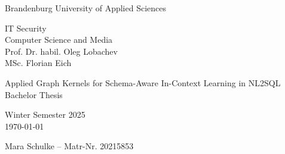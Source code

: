 \begin{titlepage}
    \begin{center}
        \begin{Large}
            Brandenburg University of Applied Sciences \\[1em]
        \end{Large}
        IT Security \\
        Computer Science and Media \\
        Prof. Dr. habil. Oleg Lobachev \\
        MSc. Florian Eich
    \end{center}

    \vfill

    \begin{center}
        \Large{Applied Graph Kernels for Schema-Aware In-Context Learning in NL2SQL}\\[0.5em]
        \large{Bachelor Thesis}\\[1em]
        
        \begin{normalsize}
            Winter Semester 2025\\[0.25em]
            \today
        \end{normalsize}
    \end{center}

    \vfill

    \begin{center}
        Mara Schulke – Matr-Nr. 20215853
    \end{center}
\end{titlepage}
